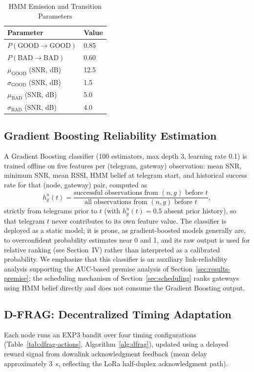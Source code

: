 \documentclass[journal]{IEEEtran}
\begin{document}
\begin{table}[t]
\caption{HMM Emission and Transition Parameters}
\label{tab:hmm-params}
\centering
\begin{tabular}{@{}ll@{}}
\toprule
Parameter & Value \\
\midrule
$P(\text{GOOD}\to\text{GOOD})$ & 0.85 \\
$P(\text{BAD}\to\text{BAD})$ & 0.60 \\
$\mu_{\text{GOOD}}$ (SNR, dB) & 12.5 \\
$\sigma_{\text{GOOD}}$ (SNR, dB) & 1.5 \\
$\mu_{\text{BAD}}$ (SNR, dB) & 5.0 \\
$\sigma_{\text{BAD}}$ (SNR, dB) & 4.0 \\
\bottomrule
\end{tabular}
\end{table}

\subsection{Gradient Boosting Reliability Estimation}
A Gradient Boosting classifier (100 estimators, max depth 3, learning rate 0.1) is trained offline on five features per (telegram, gateway) observation: mean SNR, minimum SNR, mean RSSI, HMM belief at telegram start, and historical success rate for that (node, gateway) pair, computed as
\begin{equation}
h_g^n(t) = \frac{\text{successful observations from } (n,g) \text{ before } t}{\text{all observations from } (n,g) \text{ before } t},
\end{equation}
strictly from telegrams prior to $t$ (with $h_g^n(t)=0.5$ absent prior history), so that telegram $t$ never contributes to its own feature value. The classifier is deployed as a static model; it is prone, as gradient-boosted models generally are, to overconfident probability estimates near 0 and 1, and its raw output is used for relative ranking (see Section~IV) rather than interpreted as a calibrated probability. We emphasize that this classifier is an auxiliary link-reliability analysis supporting the AUC-based premise analysis of Section~\ref{sec:results-premise}; the scheduling mechanism of Section~\ref{sec:scheduling} ranks gateways using HMM belief directly and does not consume the Gradient Boosting output.

\subsection{D-FRAG: Decentralized Timing Adaptation}
\label{sec:dfrag}
Each node runs an EXP3 bandit over four timing configurations (Table~\ref{tab:dfrag-actions}, Algorithm~\ref{alg:dfrag}), updated using a delayed reward signal from downlink acknowledgment feedback (mean delay approximately 3~s, reflecting the LoRa half-duplex acknowledgment path).
\end{document}
